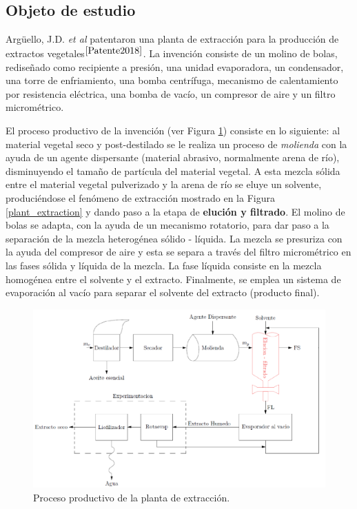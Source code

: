 \subsection{Objeto de estudio}

\noindent
\justify

Arg\"uello, J.D. \textit{et al} patentaron una planta de extracci\'on para la producci\'on de extractos vegetales$^{\cite{Patente2018}}$. La invenci\'on consiste de un molino de bolas, redise\~nado como recipiente a presi\'on, una unidad evaporadora, un condensador, una torre de enfriamiento, una bomba centr\'ifuga, mecanismo de calentamiento por resistencia el\'ectrica, una bomba de vac\'io, un compresor de aire y un filtro microm\'etrico.

\noindent
\justify

El proceso productivo de la invenci\'on (ver Figura \ref{planta}) consiste en lo siguiente: al material vegetal seco y post-destilado se le realiza un proceso de \textit{molienda} con la ayuda de un agente dispersante (material abrasivo, normalmente arena de r\'io), disminuyendo el tama\~no de part\'icula del material vegetal. A esta mezcla s\'olida entre el material vegetal pulverizado y la arena de r\'io se eluye un solvente, produci\'endose el fen\'omeno de extracci\'on mostrado en la Figura \ref{plant_extraction} y dando paso a la etapa de \textbf{eluci\'on y filtrado}. El molino de bolas se adapta, con la ayuda de un mecanismo rotatorio, para dar paso a la separaci\'on de la mezcla heterog\'enea s\'olido - l\'iquida. La mezcla se presuriza con la ayuda del compresor de aire y esta se separa a trav\'es del filtro microm\'etrico en las fases s\'olida y l\'iquida de la mezcla. La fase l\'iquida consiste en la mezcla homog\'enea entre el solvente y el extracto. Finalmente, se emplea un sistema de evaporaci\'on al vac\'io para separar el solvente del extracto (producto final). 

\begin{figure}[h!]
	\centering
	\includegraphics[width=\textwidth]{Images/Planta.png}
	\caption{Proceso productivo de la planta de extracci\'on.}
	\label{planta}
\end{figure}

